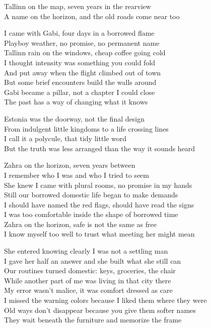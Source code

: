 \begin{lyrics}
Tallinn on the map, seven years in the rearview\\
A name on the horizon, and the old roads come near too

I came with Gabi, four days in a borrowed flame\\
Playboy weather, no promise, no permanent name\\
Tallinn rain on the windows, cheap coffee going cold\\
I thought intensity was something you could fold\\
And put away when the flight climbed out of town\\
But some brief encounters build the walls around\\
Gabi became a pillar, not a chapter I could close\\
The past has a way of changing what it knows

Estonia was the doorway, not the final design\\
From indulgent little kingdoms to a life crossing lines\\
I call it a polycule, that tidy little word\\
But the truth was less arranged than the way it sounds heard

Zahra on the horizon, seven years between\\
I remember who I was and who I tried to seem\\
She knew I came with plural rooms, no promise in my hands\\
Still our borrowed domestic life began to make demands\\
I should have named the red flags, should have read the signs\\
I was too comfortable inside the shape of borrowed time\\
Zahra on the horizon, safe is not the same as free\\
I know myself too well to trust what meeting her might mean

She entered knowing clearly I was not a settling man\\
I gave her half an answer and she built what she still can\\
Our routines turned domestic: keys, groceries, the chair\\
While another part of me was living in that city there\\
My error wasn't malice, it was comfort dressed as care\\
I missed the warning colors because I liked them where they were\\
Old ways don't disappear because you give them softer names\\
They wait beneath the furniture and memorize the frame


\end{lyrics}
